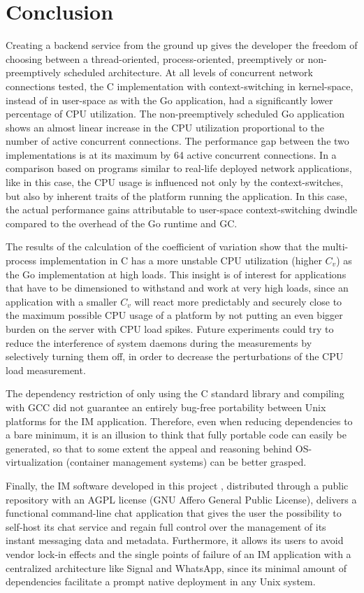 \section{Conclusion}
Creating a backend service from the ground up gives the developer the freedom of choosing between a thread-oriented, process-oriented, preemptively or non-preemptively scheduled architecture. At all levels of concurrent network connections tested, the C implementation with context-switching in kernel-space, instead of in user-space as with the Go application, had a significantly lower percentage of CPU utilization. The non-preemptively scheduled Go application shows an almost linear increase in the CPU utilization proportional to the number of active concurrent connections. The performance gap between the two implementations is at its maximum by 64 active concurrent connections. In a comparison based on programs similar to real-life deployed network applications, like in this case, the CPU usage is influenced not only by the context-switches, but also by inherent traits of the platform running the application. In this case, the actual performance gains attributable to user-space context-switching dwindle compared to the overhead of the Go runtime and GC.

The results of the calculation of the coefficient of variation show that the multi-process implementation in C has a more unstable CPU utilization (higher $C_v$) as the Go implementation at high loads. This insight is of interest for applications that have to be dimensioned to withstand and work at very high loads, since an application with a smaller $C_v$ will react more predictably and securely close to the maximum possible CPU usage of a platform by not putting an even bigger burden on the server with CPU load spikes. Future experiments could try to reduce the interference of system daemons during the measurements by selectively turning them off, in order to decrease the perturbations of the CPU load measurement.

The dependency restriction of only using the C standard library and compiling with GCC did not guarantee an entirely bug-free portability between Unix platforms for the IM application. Therefore, even when reducing dependencies to a bare minimum, it is an illusion to think that fully portable code can easily be generated, so that to some extent the appeal and reasoning behind OS-virtualization (container management systems) can be better grasped.

Finally, the IM software developed in this project \cite{Rodriguez2022}, distributed through a public repository with an AGPL license (GNU Affero General Public License), delivers a functional command-line chat application that gives the user the possibility to self-host its chat service and regain full control over the management of its instant messaging data and metadata. Furthermore, it allows its users to avoid vendor lock-in effects and the single points of failure of an IM application with a centralized architecture like Signal and WhatsApp, since its minimal amount of dependencies facilitate a prompt native deployment in any Unix system.